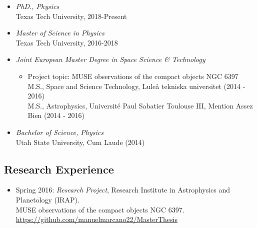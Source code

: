 \documentclass[letterpaper,10pt]{article}
\begin{document}
\begin{itemize}[label=$\blacktriangleright$]

  \item \emph{PhD., Physics}  \\
   Texas Tech University, 2018-Present




  \item \emph{Master of Science in Physics}  \\
   Texas Tech University, 2016-2018



  \item \emph{Joint European Master Degree in Space Science \& Technology} 
  \begin{itemize}[label=]
      \vspace{-.05cm}
      \item Project topic: MUSE observations of the compact objects NGC 6397 \\
      M.S., Space and Science Technology, Lule\r a tekniska universitet  (2014 - 2016) \\
      M.S., Astrophysics, Universit\'e Paul Sabatier Toulouse III, Mention Assez Bien (2014 - 2016) 
  \end{itemize}




  \item \emph{Bachelor of Science, Physics}  \\
   Utah State University, Cum Laude (2014)

\end{itemize}


\subsection*{Research Experience}




\begin{itemize}[label=$\blacktriangleright$]
        \item Spring 2016: \emph{Research Project}, Research Institute in Astrophysics and Planetology (IRAP).\\
                MUSE observations of the compact objects NGC 6397. \url{https://github.com/manuelmarcano22/MasterThesis} 
                
\end{itemize}
                
\end{document}
